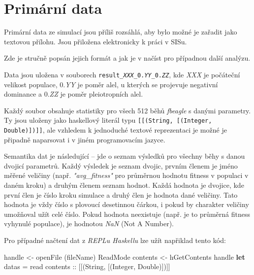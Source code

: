 \section{Primární data}
\label{sec:primarydata}

Primární data ze simulací jsou příliš rozsáhlá, aby bylo možné je zařadit jako textovou přílohu. Jsou přiložena elektronicky k práci v SISu.

Zde je stručně popsán jejich formát a jak je v načíst pro případnou další analýzu.

Data jsou uložena v souborech \texttt{result\_\textit{XXX}\_0.\textit{YY}\_0.\textit{ZZ}}, kde
\textit{XXX} je počáteční velikost populace,
0.\textit{YY} je poměr alel, u kterých se projevuje negativní dominance
a 0.\textit{ZZ} je poměr pleiotropních alel.

Každý soubor obsahuje statistiky pro všech 512 běhů \textit{fbeagle} s danými parametry. Ty jsou uloženy jako
haskellový literál typu \texttt{[[(String, [(Integer, Double)])]]}, ale vzhledem k jednoduché textové
reprezentaci je možné je připadně naparsovat i v jiném programovacím jazyce.

Semantika dat je následující -- jde o seznam výsledků pro všechny běhy s danou dvojicí parametrů. Každý výsledek
je seznam dvojic, prvním členem je jméno měřené veličiny (např. \textit{"avg\_fitness"} pro průměrnou hodnotu
fitness v populaci v daném kroku) a druhým členem seznam hodnot. Každá hodnota je dvojice, kde první člen je
číslo kroku simulace a druhý člen je hodnota dané veličiny. Tato hodnota je vždy číslo s plovoucí desetinnou čárkou,
i pokud by charakter veličiny umožňoval užít celé číslo. Pokud hodnota neexistuje (např. je to průměrná fitness vyhynulé
populace), je hodnotou \textit{NaN} (Not A Number).

Pro případné načtení dat z \textit{REPLu Haskellu} lze užít napřiklad tento kód:

\begin{code}[commandchars=\\\{\}]
handle <- openFile (fileName) ReadMode
contents <- hGetContents handle
\textbf{let}
        datas = read contents :: [[(String, [(Integer, Double)])]]
\end{code}
